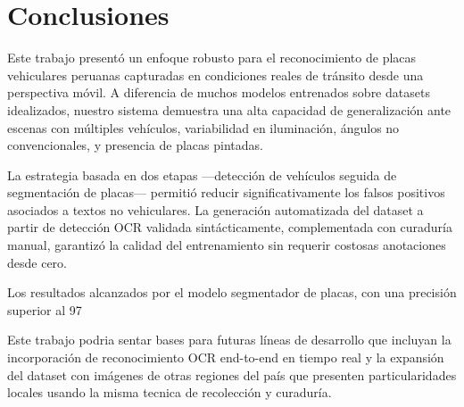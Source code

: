 \documentclass[conference]{IEEEtran}
\begin{document}
\section{Conclusiones}

Este trabajo presentó un enfoque robusto para el reconocimiento de placas vehiculares peruanas capturadas en condiciones reales de tránsito desde una perspectiva móvil. A diferencia de muchos modelos entrenados sobre datasets idealizados, nuestro sistema demuestra una alta capacidad de generalización ante escenas con múltiples vehículos, variabilidad en iluminación, ángulos no convencionales, y presencia de placas pintadas.

La estrategia basada en dos etapas —detección de vehículos seguida de segmentación de placas— permitió reducir significativamente los falsos positivos asociados a textos no vehiculares. La generación automatizada del dataset a partir de detección OCR validada sintácticamente, complementada con curaduría manual, garantizó la calidad del entrenamiento sin requerir costosas anotaciones desde cero.

Los resultados alcanzados por el modelo segmentador de placas, con una precisión superior al 97%

Este trabajo podria sentar bases para futuras líneas de desarrollo que incluyan la incorporación de reconocimiento OCR end-to-end en tiempo real y la expansión del dataset con imágenes de otras regiones del país que presenten particularidades locales usando la misma tecnica de recolección y curaduría. 
\end{document}
